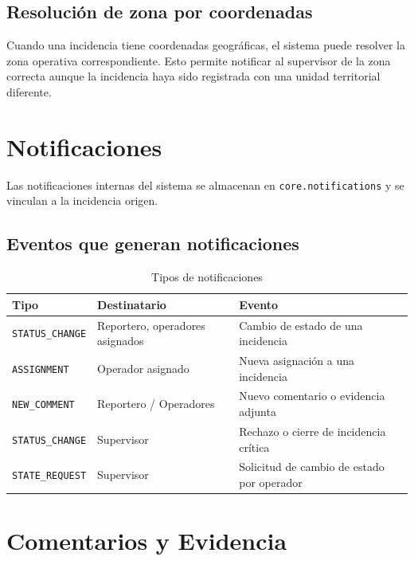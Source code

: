 \documentclass[11pt, a4paper]{article}
\begin{document}
\subsection{Resolución de zona por coordenadas}

Cuando una incidencia tiene coordenadas geográficas, el sistema puede resolver la zona operativa correspondiente. Esto permite notificar al supervisor de la zona correcta aunque la incidencia haya sido registrada con una unidad territorial diferente.


\section{Notificaciones}

Las notificaciones internas del sistema se almacenan en \texttt{core.notifications} y se vinculan a la incidencia origen.

\subsection{Eventos que generan notificaciones}

\begin{table}[H]
\centering
\begin{tabularx}{\textwidth}{l l X}
  \toprule
  \textbf{Tipo} & \textbf{Destinatario} & \textbf{Evento} \\
  \midrule
  \texttt{STATUS\_CHANGE}     & Reportero, operadores asignados & Cambio de estado de una incidencia \\
  \texttt{ASSIGNMENT}         & Operador asignado               & Nueva asignación a una incidencia \\
  \texttt{NEW\_COMMENT}       & Reportero / Operadores          & Nuevo comentario o evidencia adjunta \\
  \texttt{STATUS\_CHANGE}     & Supervisor                      & Rechazo o cierre de incidencia crítica \\
  \texttt{STATE\_REQUEST}     & Supervisor                      & Solicitud de cambio de estado por operador \\
  \bottomrule
\end{tabularx}
\caption{Tipos de notificaciones}
\end{table}


\section{Comentarios y Evidencia}
\end{document}
